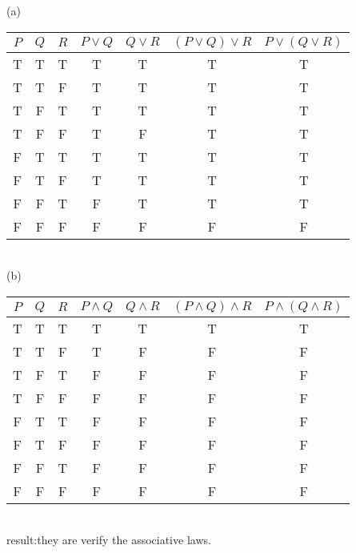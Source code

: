 \documentclass[12pt]{article}
\begin{document}
(a)
\begin{tabular}{|c|c|c|c|c|c|c|}
    \hline 
    $P$ & $Q$ & $R$ & $P\lor Q$ & $ Q\lor R$ & $(P\lor Q)\lor R$ & $P\lor (Q\lor R)$\\
    \hline 
    T&T&T&T&T&T&T\\
    \hline 
    T&T&F&T&T&T&T\\
    \hline 
    T&F&T&T&T&T&T\\
    \hline 
    T&F&F&T&F&T&T\\
    \hline 
    F&T&T&T&T&T&T\\
    \hline 
    F&T&F&T&T&T&T\\
    \hline 
    F&F&T&F&T&T&T\\
    \hline 
    F&F&F&F&F&F&F\\
    \hline
\end{tabular}
\\
(b)
\begin{tabular}{|c|c|c|c|c|c|c|}
    \hline 
    $P$ & $Q$ & $R$ & $P\land  Q$ & $ Q\land  R$ & $(P\land Q)\land  R$ & $P\land  (Q\land R)$\\
    \hline 
    T&T&T&T&T&T&T\\
    \hline 
    T&T&F&T&F&F&F\\
    \hline 
    T&F&T&F&F&F&F\\
    \hline 
    T&F&F&F&F&F&F\\
    \hline 
    F&T&T&F&F&F&F\\
    \hline 
    F&T&F&F&F&F&F\\
    \hline 
    F&F&T&F&F&F&F\\
    \hline 
    F&F&F&F&F&F&F\\
    \hline
\end{tabular}
\\
result:they are verify the associative laws.\\
\end{document}
